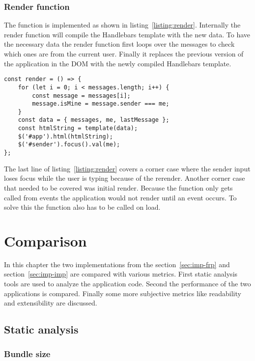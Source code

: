 \subsubsection{Render function}
The  function is implemented as shown in listing~\ref{listing:render}.
Internally the render function will compile the Handlebars template with the new data. To have the necessary data the render function first loops over the messages to check which ones are from the current user. Finally it replaces the previous version of the application in the DOM with the newly compiled Handlebars template.

\begin{lstlisting}[caption=Implementation of the render function,label=listing:render]
const render = () => {
	for (let i = 0; i < messages.length; i++) {
		const message = messages[i];
		message.isMine = message.sender === me;
	}
	const data = { messages, me, lastMessage };
	const htmlString = template(data);
	$('#app').html(htmlString);
	$('#sender').focus().val(me);
};
\end{lstlisting}

The last line of listing~\ref{listing:render} covers a corner case where the sender input loses focus while the user is typing because of the rerender. Another corner case that needed to be covered was initial render. Because the  function only gets called from events the application would not render until an event occurs. To solve this the  function also has to be called on load.

\section{Comparison}

In this chapter the two implementations from the section~\ref{sec:imp-frp} and section~\ref{sec:imp-imp} are compared with various metrics. First static analysis tools are used to analyze the application code. Second the performance of the two applications is compared. Finally some more subjective metrics like readability and extensibility are discussed.

\subsection{Static analysis}

\subsubsection{Bundle size}

